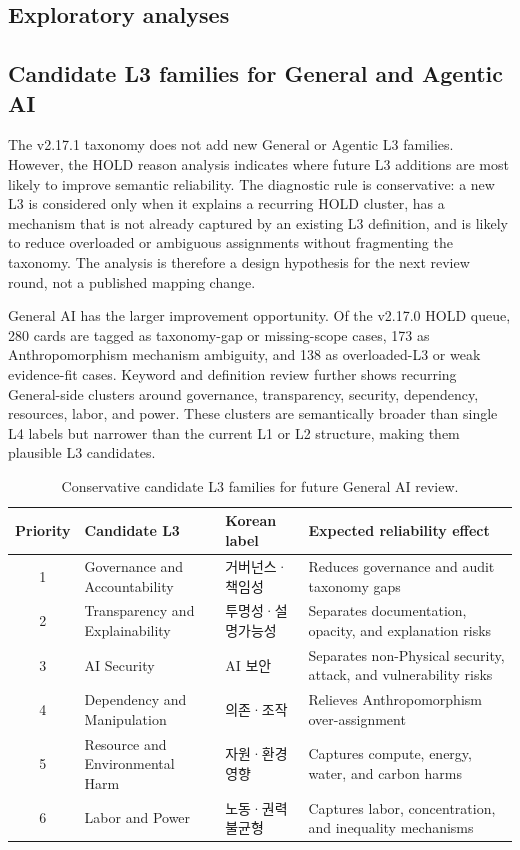\documentclass[11pt,a4paper]{article}
\newcommand{\ko}[1]{{\krfont #1}}
\begin{document}
\begin{appendices}
\section{Exploratory analyses}
\label{app:expansion}

\subsection{Candidate L3 families for General and Agentic AI}

The v2.17.1 taxonomy does not add new General or Agentic L3 families. However,
the HOLD reason analysis indicates where future L3 additions are most likely
to improve semantic reliability. The diagnostic rule is conservative: a new L3
is considered only when it explains a recurring HOLD cluster, has a mechanism
that is not already captured by an existing L3 definition, and is likely to
reduce overloaded or ambiguous assignments without fragmenting the taxonomy.
The analysis is therefore a design hypothesis for the next review round, not a
published mapping change.

General AI has the larger improvement opportunity. Of the v2.17.0 HOLD queue,
280 cards are tagged as taxonomy-gap or missing-scope cases, 173 as
Anthropomorphism mechanism ambiguity, and 138 as overloaded-L3 or weak
evidence-fit cases. Keyword and definition review further shows recurring
General-side clusters around governance, transparency, security, dependency,
resources, labor, and power. These clusters are semantically broader than
single L4 labels but narrower than the current L1 or L2 structure, making them
plausible L3 candidates.

\begin{table}[ht]
\centering
\caption{Conservative candidate L3 families for future General AI review.}
\label{tab:general-candidate-l3}
\small
\setlength{\tabcolsep}{4pt}
\begin{tabularx}{\textwidth}{@{}c L{4.4cm} L{2.8cm} Y@{}}
\toprule
Priority & Candidate L3 & Korean label & Expected reliability effect \\
 & Governance and Accountability & \ko{거버넌스·책임성} & Reduces governance and audit taxonomy gaps \\
2 & Transparency and Explainability & \ko{투명성·설명가능성} & Separates documentation, opacity, and explanation risks \\
3 & AI Security & AI \ko{보안} & Separates non-Physical security, attack, and vulnerability risks \\
4 & Dependency and Manipulation & \ko{의존·조작} & Relieves Anthropomorphism over-assignment \\
5 & Resource and Environmental Harm & \ko{자원·환경 영향} & Captures compute, energy, water, and carbon harms \\
6 & Labor and Power & \ko{노동·권력 불균형} & Captures labor, concentration, and inequality mechanisms \\
\bottomrule
\end{tabularx}
\end{table}


\end{appendices}
\end{document}
